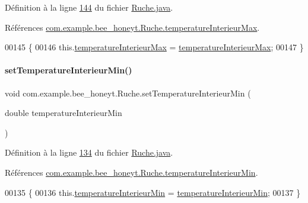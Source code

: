 Définition à la ligne \hyperlink{_ruche_8java_source_l00144}{144} du fichier \hyperlink{_ruche_8java_source}{Ruche.\+java}.



Références \hyperlink{_ruche_8java_source_l00026}{com.\+example.\+bee\+\_\+honeyt.\+Ruche.\+temperature\+Interieur\+Max}.


\begin{DoxyCode}
00145     \{
00146         this.\hyperlink{classcom_1_1example_1_1bee__honeyt_1_1_ruche_af2d8d214dabc9af08329aa3173047245}{temperatureInterieurMax} = 
      \hyperlink{classcom_1_1example_1_1bee__honeyt_1_1_ruche_af2d8d214dabc9af08329aa3173047245}{temperatureInterieurMax};
00147     \}
\end{DoxyCode}
\mbox{\label{classcom_1_1example_1_1bee__honeyt_1_1_ruche_abd355743c57f79e2bf544bd20559b33f}} 
\paragraph{\texorpdfstring{set\+Temperature\+Interieur\+Min()}{setTemperatureInterieurMin()}}
{\footnotesize\ttfamily void com.\+example.\+bee\+\_\+honeyt.\+Ruche.\+set\+Temperature\+Interieur\+Min (\begin{DoxyParamCaption}\item[{double}]{temperature\+Interieur\+Min }\end{DoxyParamCaption})}



Définition à la ligne \hyperlink{_ruche_8java_source_l00134}{134} du fichier \hyperlink{_ruche_8java_source}{Ruche.\+java}.



Références \hyperlink{_ruche_8java_source_l00025}{com.\+example.\+bee\+\_\+honeyt.\+Ruche.\+temperature\+Interieur\+Min}.


\begin{DoxyCode}
00135     \{
00136         this.\hyperlink{classcom_1_1example_1_1bee__honeyt_1_1_ruche_a143b0b293ab3aaa67a86550efeb56f07}{temperatureInterieurMin} = 
      \hyperlink{classcom_1_1example_1_1bee__honeyt_1_1_ruche_a143b0b293ab3aaa67a86550efeb56f07}{temperatureInterieurMin};
00137     \}
\end{DoxyCode}


